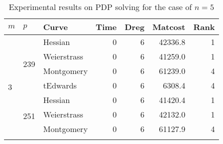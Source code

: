 
\begin{table}[!h]
\centering
\caption{Experimental results on PDP solving for the case of $n=5$}
\label{tb:pdpsolving}
\begin{tabular}{lllrrrr}
\hline
\multicolumn{1}{|l|}{$m$}                & \multicolumn{1}{l|}{$p$}                  & \multicolumn{1}{l|}{Curve}       & \multicolumn{1}{l|}{Time}  & \multicolumn{1}{l|}{Dreg} & \multicolumn{1}{l|}{Matcost}     & \multicolumn{1}{l|}{Rank} \\ \hline \hline
\multicolumn{1}{|l|}{\multirow{8}{*}{3}} & \multicolumn{1}{l|}{\multirow{4}{*}{239}} & \multicolumn{1}{l|}{Hessian}     & \multicolumn{1}{r|}{0}     & \multicolumn{1}{r|}{6}    & \multicolumn{1}{r|}{42336.8}     & \multicolumn{1}{r|}{1}    \\ \cline{3-7} 
\multicolumn{1}{|l|}{}                   & \multicolumn{1}{l|}{}                     & \multicolumn{1}{l|}{Weierstrass} & \multicolumn{1}{r|}{0}     & \multicolumn{1}{r|}{6}    & \multicolumn{1}{r|}{41259.0}     & \multicolumn{1}{r|}{1}    \\ \cline{3-7} 
\multicolumn{1}{|l|}{}                   & \multicolumn{1}{l|}{}                     & \multicolumn{1}{l|}{Montgomery}  & \multicolumn{1}{r|}{0}     & \multicolumn{1}{r|}{6}    & \multicolumn{1}{r|}{61239.0}     & \multicolumn{1}{r|}{4}    \\ \cline{3-7} 
\multicolumn{1}{|l|}{}                   & \multicolumn{1}{l|}{}                    & \multicolumn{1}{l|}{tEdwards}    & \multicolumn{1}{r|}{0}     & \multicolumn{1}{r|}{6}    & \multicolumn{1}{r|}{6308.4}      & \multicolumn{1}{r|}{4}    \\ \cline{2-7} 
\multicolumn{1}{|l|}{}                   & \multicolumn{1}{l|}{\multirow{4}{*}{251}} & \multicolumn{1}{l|}{Hessian}     & \multicolumn{1}{r|}{0}     & \multicolumn{1}{r|}{6}    & \multicolumn{1}{r|}{41420.4}     & \multicolumn{1}{r|}{1}    \\ \cline{3-7} 
\multicolumn{1}{|l|}{}                   & \multicolumn{1}{l|}{}                     & \multicolumn{1}{l|}{Weierstrass} & \multicolumn{1}{r|}{0}     & \multicolumn{1}{r|}{6}    & \multicolumn{1}{r|}{42132.0}     & \multicolumn{1}{r|}{1}    \\ \cline{3-7} 
\multicolumn{1}{|l|}{}                   & \multicolumn{1}{l|}{}                     & \multicolumn{1}{l|}{Montgomery}  & \multicolumn{1}{r|}{0}     & \multicolumn{1}{r|}{6}    & \multicolumn{1}{r|}{61127.9}     & \multicolumn{1}{r|}{4}    \\ \cline{3-7} 

\end{tabular}
\end{table}
